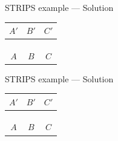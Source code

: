 \begin{frame}[fragile]{STRIPS example --- Solution}
	\begin{center}
			\begin{tabular}{c|c|c}
				  $A'$  &   $B'$  &   $C'$  \\\hline
				\emptyy & \banana & \emptyy \\
				\emptyy & \emptyy & \emptyy \\
				\emptyy & \emptyy & \boxbox\monkey \\\hline
				  $A$   &   $B$   &    $C$
			\end{tabular}
	\end{center}
\end{frame}

\begin{frame}[fragile]{STRIPS example --- Solution}
	\begin{center}
			\begin{tabular}{c|c|c}
				  $A'$  &   $B'$  &   $C'$  \\\hline
				\emptyy & \banana & \emptyy \\
				\emptyy & \emptyy & \emptyy \\
				\emptyy & \boxbox\monkey & \emptyy \\\hline
				  $A$   &   $B$   &    $C$
			\end{tabular}
	\end{center}
\end{frame}


